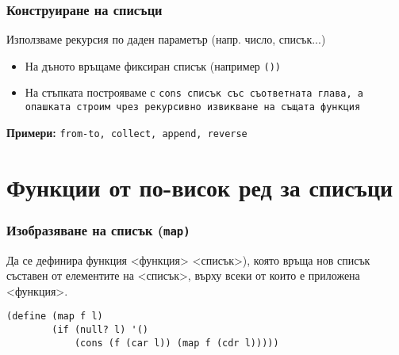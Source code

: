 \documentclass[alsotrans]{beamerswitch}
\begin{document}
\begin{frame}
  \frametitle{Конструиране на списъци}

  Използваме рекурсия по даден параметър (напр. число, списък...)
  \begin{itemize}
  \item На дъното връщаме фиксиран списък (например \tt{()})
  \item На стъпката построяваме с \tt{cons} списък със съответната глава, а опашката строим чрез рекурсивно извикване на същата функция
  \end{itemize}
  \pause
  \vspace{4ex}
  \textbf{Примери:} \tt{from-to}, \tt{collect}, \tt{append}, \tt{reverse}
\end{frame}

\section{Функции от по-висок ред за списъци}

\begin{frame}[label=map,fragile]
  \frametitle{Изобразяване на списък (\tt{map})}

  Да се дефинира функция  <функция> <списък>\tta), която връща нов списък съставен от елементите на <списък>, върху всеки от които е приложена <функция>.\\
  \pause
  \begin{center}
  \end{center}
  \pause
\begin{lstlisting}
(define (map f l)
        (if (null? l) '()
            (cons (f (car l)) (map f (cdr l)))))
\end{lstlisting}
\end{frame}
\end{document}
